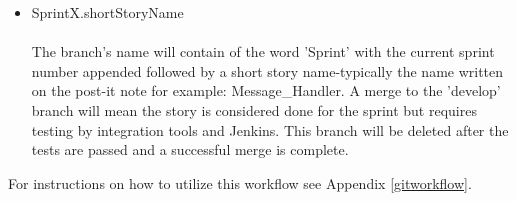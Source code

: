 \begin{itemize}
\item SprintX.shortStoryName\\ \\
The branch's name will contain of the word 'Sprint' with the current sprint number appended followed by a short story name-typically the name written on the post-it note for example: Message\_Handler. A merge to the 'develop' branch will mean the story is considered done for the sprint but requires testing by integration tools and Jenkins. This branch will be deleted after the tests are passed and a successful merge is complete.
\end{itemize}

For instructions on how to utilize this workflow see Appendix \ref{gitworkflow}.
